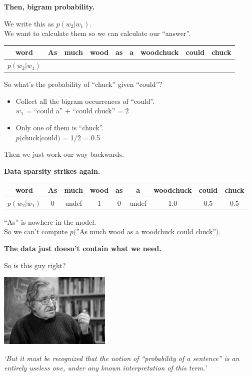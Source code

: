 \documentclass{beamer}
\newcommand{\pagestepalt}[2]{
  \begin{frame}[t]
    \begin{minipage}[t][0.26\textheight][t]{\textwidth}
      \begin{center}
        \huge
        \textbf{#1}
      \end{center}
    \end{minipage}
    
    \begin{minipage}[t][0.7\textheight][t]{\textwidth}
      #2
    \end{minipage}
  \end{frame}
}
\begin{document}
\pagestepalt{Then, bigram probability.}{
  We write this as \alert{$p(w_2|w_1)$}.\\
  We want to calculate them so we can calculate our ``answer''.
  \begin{center}
    \begin{tabular}{c|cccccccc}
      word & As & much & wood & as & a & woodchuck & could & \alert<2->{chuck}\\
      \hline
      $p(w_2|w_1)$ &&&&&&&& \only<6->{\alert{0.5}}\\
    \end{tabular}
  \end{center}\pause
  So what's the probability of ``chuck'' given ``could''?\pause
  \begin{itemize}
  \item Collect all the bigram occurrences of ``could''.\\ \pause $w_1$ \alert{= ``could a'' + ``could chuck'' = 2}\\\pause
  \item Only one of them is ``chuck''.\pause
    \\\alert{$p($chuck$|$could$)$ = 1/2 = 0.5}
  \end{itemize}\pause
  Then we just work our way backwards.
}

\pagestepalt{Data sparsity strikes again.}{
  \begin{center}
    \begin{tabular}{c|cccccccc}
      word & As & much & wood & as & a & woodchuck & could & chuck\\
      \hline
      $p(w_2|w_1)$ &\alert{0}&\alert{undef}&\alert{1} & \alert{0} & \alert{undef} & \alert{1.0} & \alert{0.5} & 0.5\\
    \end{tabular}
  \end{center}
  ``As'' is nowhere in the \alert{model}.\\
  So we can't compute
  $p($''As much wood as a woodchuck could chuck''$)$.
}

\pagestepalt{The data just doesn't contain what we need.}{
  So is this guy right?
  \begin{center}
    \includegraphics[width=0.4\textwidth]{images/noam-chomsky.jpg}

    {\it `But it must be recognized that the notion of ``probability of a sentence'' is an entirely useless one, under any known interpretation of this term.'}


  \end{center}
}
\end{document}
